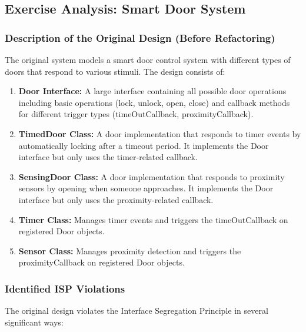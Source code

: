 \subsection{Exercise Analysis: Smart Door System}

\subsubsection{Description of the Original Design (Before Refactoring)}

The original system models a smart door control system with different types of doors that respond to various stimuli. The design consists of:

\begin{enumerate}
    \item \textbf{Door Interface:} A large interface containing all possible door operations including basic operations (lock, unlock, open, close) and callback methods for different trigger types (timeOutCallback, proximityCallback).
    
    \item \textbf{TimedDoor Class:} A door implementation that responds to timer events by automatically locking after a timeout period. It implements the Door interface but only uses the timer-related callback.
    
    \item \textbf{SensingDoor Class:} A door implementation that responds to proximity sensors by opening when someone approaches. It implements the Door interface but only uses the proximity-related callback.
    
    \item \textbf{Timer Class:} Manages timer events and triggers the timeOutCallback on registered Door objects.
    
    \item \textbf{Sensor Class:} Manages proximity detection and triggers the proximityCallback on registered Door objects.
\end{enumerate}

\subsubsection{Identified ISP Violations}

The original design violates the Interface Segregation Principle in several significant ways:

